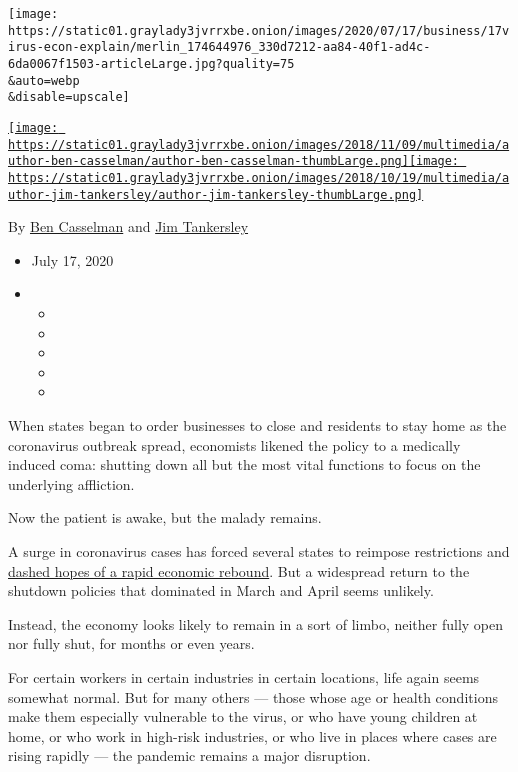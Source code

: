 \texttt{[image: https://static01.graylady3jvrrxbe.onion/images/2020/07/17/business/17virus-econ-explain/merlin\_174644976\_330d7212-aa84-40f1-ad4c-6da0067f1503-articleLarge.jpg?quality=75\\\&auto=webp\\\&disable=upscale]}

\href{https://www.nytimes3xbfgragh.onion/by/ben-casselman}{\texttt{[image: https://static01.graylady3jvrrxbe.onion/images/2018/11/09/multimedia/author-ben-casselman/author-ben-casselman-thumbLarge.png]}}\href{https://www.nytimes3xbfgragh.onion/by/jim-tankersley}{\texttt{[image: https://static01.graylady3jvrrxbe.onion/images/2018/10/19/multimedia/author-jim-tankersley/author-jim-tankersley-thumbLarge.png]}}

By \href{https://www.nytimes3xbfgragh.onion/by/ben-casselman}{Ben
Casselman} and
\href{https://www.nytimes3xbfgragh.onion/by/jim-tankersley}{Jim
Tankersley}

\begin{itemize}
\item
  July 17, 2020
\item
  \begin{itemize}
  \item
  \item
  \item
  \item
  \item
  \end{itemize}
\end{itemize}

When states began to order businesses to close and residents to stay
home as the coronavirus outbreak spread, economists likened the policy
to a medically induced coma: shutting down all but the most vital
functions to focus on the underlying affliction.

Now the patient is awake, but the malady remains.

A surge in coronavirus cases has forced several states to reimpose
restrictions and
\href{https://www.nytimes3xbfgragh.onion/2020/07/15/business/economy/economic-recovery-coronavirus-resurgence.html}{dashed
hopes of a rapid economic rebound}. But a widespread return to the
shutdown policies that dominated in March and April seems unlikely.

Instead, the economy looks likely to remain in a sort of limbo, neither
fully open nor fully shut, for months or even years.

For certain workers in certain industries in certain locations, life
again seems somewhat normal. But for many others --- those whose age or
health conditions make them especially vulnerable to the virus, or who
have young children at home, or who work in high-risk industries, or who
live in places where cases are rising rapidly --- the pandemic remains a
major disruption.

